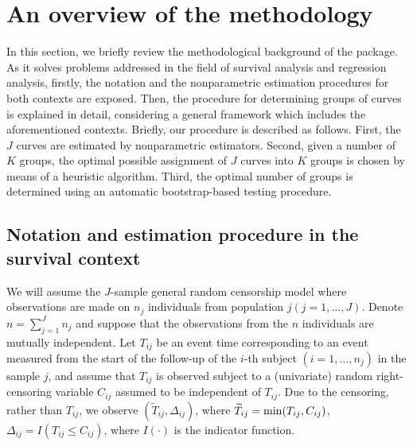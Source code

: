 \section{An overview of the methodology}
\label{method}


In this section, we briefly review the methodological background of the   package. As it solves problems addressed in the field of survival analysis and regression analysis, firstly, the notation and the nonparametric estimation procedures for both contexts are exposed. Then, the procedure for determining groups of curves is explained in detail, considering a general framework which includes the aforementioned contexts. Briefly, our procedure is described as follows.  First,    the $J$ curves are estimated   by  nonparametric estimators. Second, given a number of  $K$ groups,  the optimal    possible assignment  of  $J$ curves into $K$ groups is  chosen  by means of  a heuristic algorithm. Third,  the optimal number of groups  is determined using  an automatic bootstrap-based testing procedure.  





\subsection{Notation and estimation procedure in the survival context}
\label{nmvillanueva:survalgorithm}


We will assume the $J$-sample general random censorship model where observations are made on $n_j$ individuals from population $j (j = 1, \ldots, J)$. Denote $n = \sum_{j=1}^{J} n_j$ and suppose that the observations from the $n$ individuals are mutually independent. Let $T_{ij}$ be an event time corresponding to an event measured from the start of the follow-up of the $i$-th subject $(i = 1, \ldots,n_j)$ in the sample  $j$, and assume that  $T_{ij}$ is observed subject to a (univariate) random right-censoring variable $C_{ij}$ assumed to be independent of $T_{ij}$. Due to the censoring, rather than $T_{ij}$, we observe $(\widetilde{T}_{ij},\Delta_{ij})$, where $\widetilde{T}_{ij}= {\rm{min}} (T_{ij},C_{ij})$, $\Delta_{ij}=I(T_{ij}\leq C_{ij})$, where $I(\cdot)$ is the indicator function. 

